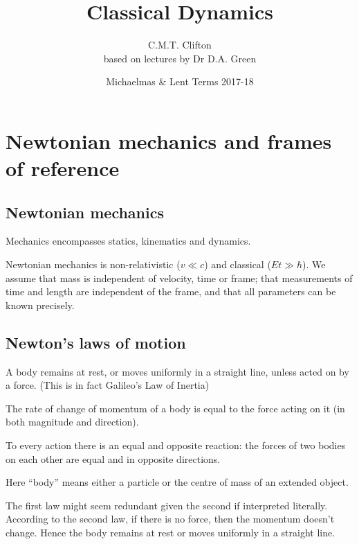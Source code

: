 \documentclass[a4paper]{article}
\title{Classical Dynamics}
\author{C.M.T. Clifton \\ \small based on lectures by Dr D.A. Green}
\date{Michaelmas \& Lent Terms 2017-18}
\begin{document}
\maketitle
\tableofcontents
\newpage

\section{Newtonian mechanics and frames of reference}\label{sec:newtonian-mechanics-and-frames-of-reference}
\subsection{Newtonian mechanics}\label{sec:newtonian-mechanics}
Mechanics encompasses statics, kinematics and dynamics.

Newtonian mechanics is non-relativistic ($v \ll c$) and classical ($E t \gg \hbar$). We assume that mass is independent of velocity, time or frame; that measurements of time and length are independent of the frame, and that all parameters can be known precisely.

\subsection{Newton's laws of motion}\label{sec:newton's-laws-of-motion}
\begin{law}
  A body remains at rest, or moves uniformly in a straight line, unless acted on by a force. (This is in fact Galileo's Law of Inertia)
\end{law} 

\begin{law}
   The rate of change of momentum of a body is equal to the force acting on it (in both magnitude and direction).
\end{law} 

\begin{law}
  To every action there is an equal and opposite reaction: the forces of two bodies on each other are equal and in opposite directions.
\end{law}

Here ``body'' means either a particle or the centre of mass of an extended object.

The first law might seem redundant given the second if interpreted literally. According to the second law, if there is no force, then the momentum doesn't change. Hence the body remains at rest or moves uniformly in a straight line.
\end{document}
